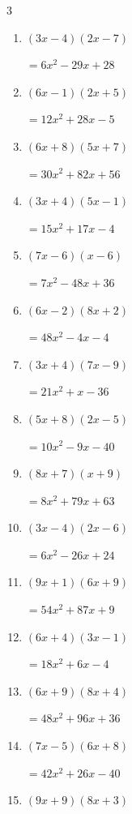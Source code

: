 \begin{multicols}{3}
\begin{enumerate}
        $=30x^{2}-23x+3$

\columnbreak %

  \item $(3x-4)(2x-7)$

        $=6x^{2}-29x+28$

  \item $(6x-1)(2x+5)$

        $=12x^{2}+28x-5$

  \item $(6x+8)(5x+7)$

        $=30x^{2}+82x+56$

  \item $(3x+4)(5x-1)$

        $=15x^{2}+17x-4$

  \item $(7x-6)(x-6)$

        $=7x^{2}-48x+36$

  \item $(6x-2)(8x+2)$

        $=48x^{2}-4x-4$

  \item $(3x+4)(7x-9)$

        $=21x^{2}+x-36$

  \item $(5x+8)(2x-5)$

        $=10x^{2}-9x-40$

  \item $(8x+7)(x+9)$

        $=8x^{2}+79x+63$

  \item $(3x-4)(2x-6)$

        $=6x^{2}-26x+24$

  \item $(9x+1)(6x+9)$

        $=54x^{2}+87x+9$

  \item $(6x+4)(3x-1)$

        $=18x^{2}+6x-4$

  \item $(6x+9)(8x+4)$

        $=48x^{2}+96x+36$

  \item $(7x-5)(6x+8)$

        $=42x^{2}+26x-40$

  \item $(9x+9)(8x+3)$


\end{enumerate}
\end{multicols}
